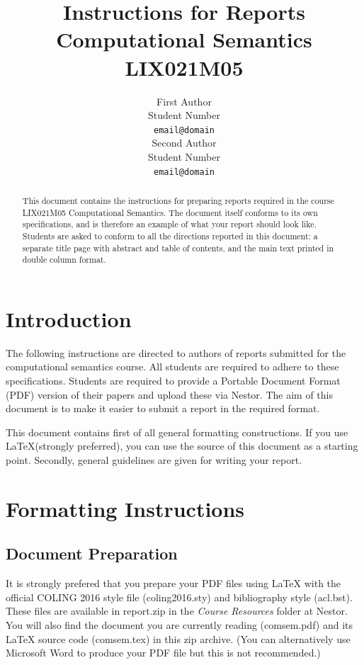 \documentclass[11pt]{article}
\title{Instructions for Reports\\
       Computational Semantics LIX021M05}
\author{First Author \\
   Student Number \\
  {\tt email@domain} \\\And
  Second Author \\
   Student Number \\
  {\tt email@domain} \\}
\date{}
\begin{document}
\maketitle
\begin{abstract}
  This document contains the instructions for preparing reports
  required in the course LIX021M05 Computational Semantics. The
  document itself conforms to its own specifications, and is therefore
  an example of what your report should look like.  Students are asked
  to conform to all the directions reported in this document: a
  separate title page with abstract and table of contents, and the
  main text printed in double column format. 
\end{abstract}

\vfill
\tableofcontents
\clearpage 
\setcounter{page}{1}
\twocolumn

\section{Introduction}\label{sec:intro}

%
% 

The following instructions are directed to authors of reports
submitted for the computational semantics course. All students are
required to adhere to these specifications. Students are required to
provide a Portable Document Format (PDF) version of their papers and
upload these via Nestor. The aim of this document is to make it easier
to submit a report in the required format. 

This document contains first of all general formatting
constructions. If you use \LaTeX (strongly preferred), you can use
the source of this document as a starting point. Secondly, general
guidelines are given for writing your report.


\section{Formatting Instructions}

\subsection{Document Preparation}

It is strongly prefered that you prepare your PDF files using \LaTeX{} with
the official COLING 2016 style file (coling2016.sty) and bibliography
style (acl.bst). These files are available in report.zip in the
\textit{Course Resources} folder at Nestor.  You will also find the
document you are currently reading (comsem.pdf) and its \LaTeX{}
source code (comsem.tex) in this zip archive.  (You can alternatively
use Microsoft Word to produce your PDF file but this is not
recommended.)
\end{document}
